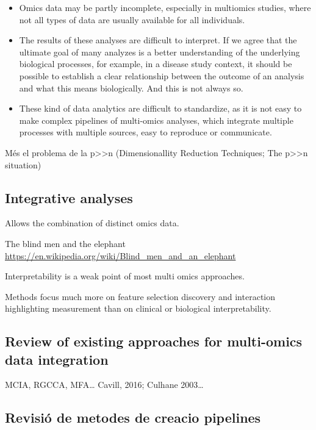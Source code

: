 \documentclass[a4paper, nobind]{templates/ociamthesis}
\begin{document}
\begin{itemize}
\item
  Omics data may be partly incomplete, especially in multiomics studies, where not all types of data are usually available for all individuals.
\item
  The results of these analyses are difficult to interpret. If we agree that the ultimate goal of many analyzes is a better understanding of the underlying biological processes, for example, in a disease study context, it should be possible to establish a clear relationship between the outcome of an analysis and what this means biologically. And this is not always so.
\item
  These kind of data analytics are difficult to standardize, as it is not easy to make complex pipelines of multi-omics analyses, which integrate multiple processes with multiple sources, easy to reproduce or communicate.
\end{itemize}

Més el problema de la p\textgreater\textgreater n (Dimensionallity Reduction Techniques; The p\textgreater\textgreater n situation)

\hypertarget{integrative-analyses}{%
\subsection{Integrative analyses}\label{integrative-analyses}}

Allows the combination of distinct omics data.

The blind men and the elephant \url{https://en.wikipedia.org/wiki/Blind_men_and_an_elephant}

Interpretability is a weak point of most multi omics approaches.

Methods focus much more on feature selection discovery and interaction highlighting measurement than on clinical or biological interpretability.

\hypertarget{review-of-existing-approaches-for-multi-omics-data-integration}{%
\subsection{Review of existing approaches for multi-omics data integration}\label{review-of-existing-approaches-for-multi-omics-data-integration}}

MCIA, RGCCA, MFA\ldots{} Cavill, 2016; Culhane 2003\ldots{}

\hypertarget{revisiuxf3-de-metodes-de-creacio-pipelines}{%
\subsection{Revisió de metodes de creacio pipelines}\label{revisiuxf3-de-metodes-de-creacio-pipelines}}
\end{document}
